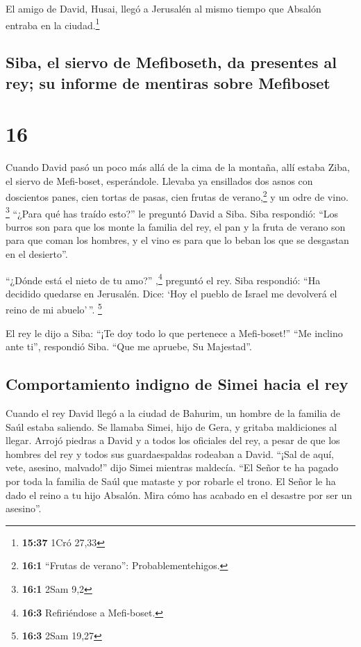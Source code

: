  El amigo de David, Husai, llegó a Jerusalén al mismo
tiempo que Absalón entraba en la ciudad.\footnote{\textbf{15:37} 1Cró
  27,33}

\hypertarget{siba-el-siervo-de-mefiboseth-da-presentes-al-rey-su-informe-de-mentiras-sobre-mefiboset}{%
\subsection{Siba, el siervo de Mefiboseth, da presentes al rey; su
informe de mentiras sobre
Mefiboset}\label{siba-el-siervo-de-mefiboseth-da-presentes-al-rey-su-informe-de-mentiras-sobre-mefiboset}}

\hypertarget{section-15}{%
\section{16}\label{section-15}}

 Cuando David pasó un poco más allá de la cima de la
montaña, allí estaba Ziba, el siervo de Mefi-boset, esperándole. Llevaba
ya ensillados dos asnos con doscientos panes, cien tortas de pasas, cien
frutas de verano,\footnote{\textbf{16:1} ``Frutas de verano'':
  Probablementehigos.} y un odre de vino. \footnote{\textbf{16:1} 2Sam
  9,2}  ``¿Para qué has traído esto?'' le preguntó David a
Siba. Siba respondió: ``Los burros son para que los monte la familia del
rey, el pan y la fruta de verano son para que coman los hombres, y el
vino es para que lo beban los que se desgastan en el desierto''.

 ``¿Dónde está el nieto de tu amo?'' ,\footnote{\textbf{16:3}
  Refiriéndose a Mefi-boset.} preguntó el rey. Siba respondió: ``Ha
decidido quedarse en Jerusalén. Dice: `Hoy el pueblo de Israel me
devolverá el reino de mi abuelo'\,''. \footnote{\textbf{16:3} 2Sam 19,27}

 El rey le dijo a Siba: ``¡Te doy todo lo que pertenece a
Mefi-boset!'' ``Me inclino ante ti'', respondió Siba. ``Que me apruebe,
Su Majestad''.

\hypertarget{comportamiento-indigno-de-simei-hacia-el-rey}{%
\subsection{Comportamiento indigno de Simei hacia el
rey}\label{comportamiento-indigno-de-simei-hacia-el-rey}}

 Cuando el rey David llegó a la ciudad de Bahurim, un
hombre de la familia de Saúl estaba saliendo. Se llamaba Simei, hijo de
Gera, y gritaba maldiciones al llegar.  Arrojó piedras a
David y a todos los oficiales del rey, a pesar de que los hombres del
rey y todos sus guardaespaldas rodeaban a David.  ``¡Sal
de aquí, vete, asesino, malvado!'' dijo Simei mientras maldecía.
 ``El Señor te ha pagado por toda la familia de Saúl que
mataste y por robarle el trono. El Señor le ha dado el reino a tu hijo
Absalón. Mira cómo has acabado en el desastre por ser un asesino''.

